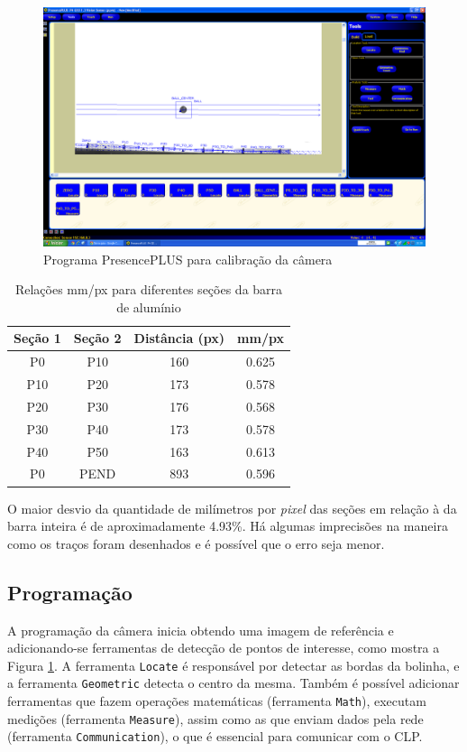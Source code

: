 \begin{figure}[!ht]
\centering
\includegraphics[width=0.9\linewidth]{figs/resultados/camera/programa}
\caption{Programa PresencePLUS para calibração da câmera \label{cameracalibracao}}
\end{figure}

\begin{table}[!ht]
\centering
\caption{Relações mm/px para diferentes seções da barra de alumínio \label{relacoesmmpx}}
	\begin{tabular}{|c|c|c|c|}
	\hline
		Seção 1 & Seção 2 & Distância (px) & mm/px\\ \hline
		P0 & P10 & 160 & 0.625\\ \hline
		P10 & P20 & 173 & 0.578\\ \hline
		P20 & P30 & 176 & 0.568\\ \hline
		P30 & P40 & 173 & 0.578\\ \hline
		P40 & P50 & 163 & 0.613\\ \hline
		P0 & PEND & 893 & 0.596\\ \hline
	\end{tabular}
\end{table}

O maior desvio da quantidade de milímetros por \textit{pixel} das seções em relação à da barra inteira é de aproximadamente 4.93\%. Há algumas imprecisões na maneira como os traços foram desenhados e é possível que o erro seja menor.

\subsection{Programação}
A programação da câmera inicia obtendo uma imagem de referência e adicionando-se ferramentas de detecção de pontos de interesse, como mostra a Figura \ref{cameracalibracao}. A ferramenta \texttt{Locate} é responsável por detectar as bordas da bolinha, e a ferramenta \texttt{Geometric} detecta o centro da mesma. Também é possível adicionar ferramentas que fazem operações matemáticas (ferramenta \texttt{Math}), executam medições (ferramenta \texttt{Measure}), assim como as que enviam dados pela rede (ferramenta \texttt{Communication}), o que é essencial para comunicar com o CLP.

